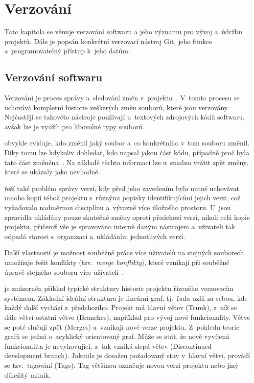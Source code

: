 \chapter{Verzování}
\label{sec:versioning}
Tato kapitola se věnuje verzování softwaru a jeho významu pro vývoj a~údržbu projektů. Dále je popsán konkrétní verzovací nástroj Git, jeho funkce a~programovatelný přístup k~jeho datům.

\section{Verzování softwaru}
\label{sec:versioning_software}
Verzování je proces správy a~sledování změn v~projektu~\cite{ernst2024vcs}. V~tomto procesu se uchovává kompletní historie veškerých změn souborů, které jsou verzovány. Nejčastěji se takovéto nástroje používají u~textových zdrojových kódů softwaru, avšak lze je využít pro libovolné typy souborů.

\VCS obvykle eviduje, kdo změnil jaký soubor a~co konkrétního v~tom souboru změnil. Díky tomu lze kdykoliv dohledat, kdo napsal jakou část kódu, případně proč byla tato část změněna~\cite{sink2011version}. Na základě těchto informací lze u~\VCS snadno vrátit zpět změny, které se ukázaly jako nevhodné.

\VCS řeší také problém správy verzí, kdy před jeho zavedením bylo nutné uchovávat mnoho kopií téhož projektu s~různými popisky identifikujícími jejich verzi, což vyžadovalo nadměrnou disciplínu a~výrazně více úložného prostoru. U~\VCS jsou zpravidla ukládány pouze skutečné změny oproti předchozí verzi, nikoli celá kopie projektu, přičemž vše je spravováno interně daným nástrojem a~uživateli tak odpadá starost s~organizací a~ukládáním jednotlivých verzí.

Další vlastností \VCS je možnost souběžné práce více uživatelů na stejných souborech. \VCS umožňuje řešit konflikty (tzv.\ \textit{merge konflikty}), které vznikají při souběžné úpravě stejného souboru více uživateli~\cite{sink2011version}.

 je znázorněn příklad typické struktury historie projektu řízeného verzovacím systémem. Základní ideální struktura je lineární graf, tj.\ řada uzlů za sebou, kde každý další vychází z~předchozího. Projekt má hlavní větev (Trunk), z~níž se dále větví ostatní větve (Branches), například pro vývoj nové funkcionality. Větve se poté slučují zpět (Merges) a~vznikají nové verze projektu. Z~pohledu teorie grafů se jedná o~acyklický orientovaný graf. Může se stát, že nově vyvíjená funkcionalita je nevyhovující, a~tak vzniká slepá větev (Discontinued development branch). Jakmile je dosažen požadovaný stav v~hlavní větvi, provádí se tzv.\ tagování (Tags). Tag většinou označuje novou verzi projektu nebo jiný důležitý milník.

